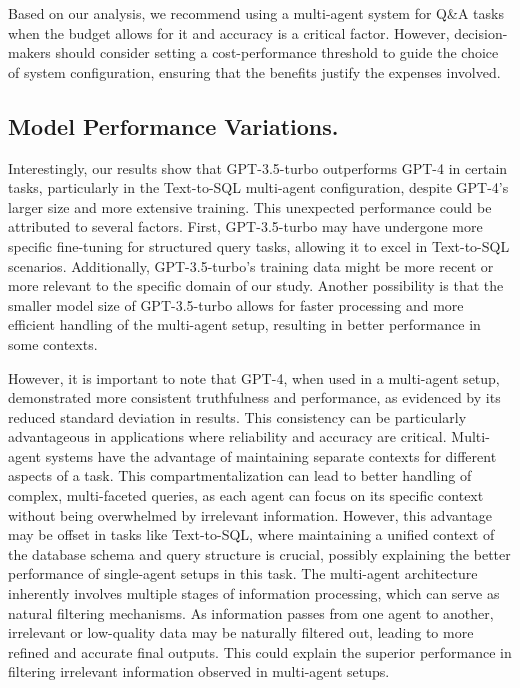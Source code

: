             Based on our analysis, we recommend using a multi-agent system for Q\&A tasks when the budget allows for it and accuracy is a critical factor. However, decision-makers should consider setting a cost-performance threshold to guide the choice of system configuration, ensuring that the benefits justify the expenses involved.


        \subsection{Model Performance Variations.}
            Interestingly, our results show that GPT-3.5-turbo outperforms GPT-4 in certain tasks, particularly in the Text-to-SQL multi-agent configuration, despite GPT-4's larger size and more extensive training. This unexpected performance could be attributed to several factors. First, GPT-3.5-turbo may have undergone more specific fine-tuning for structured query tasks, allowing it to excel in Text-to-SQL scenarios. Additionally, GPT-3.5-turbo's training data might be more recent or more relevant to the specific domain of our study. Another possibility is that the smaller model size of GPT-3.5-turbo allows for faster processing and more efficient handling of the multi-agent setup, resulting in better performance in some contexts.

            However, it is important to note that GPT-4, when used in a multi-agent setup, demonstrated more consistent truthfulness and performance, as evidenced by its reduced standard deviation in results. This consistency can be particularly advantageous in applications where reliability and accuracy are critical. Multi-agent systems have the advantage of maintaining separate contexts for different aspects of a task. This compartmentalization can lead to better handling of complex, multi-faceted queries, as each agent can focus on its specific context without being overwhelmed by irrelevant information. However, this advantage may be offset in tasks like Text-to-SQL, where maintaining a unified context of the database schema and query structure is crucial, possibly explaining the better performance of single-agent setups in this task.
            The multi-agent architecture inherently involves multiple stages of information processing, which can serve as natural filtering mechanisms. As information passes from one agent to another, irrelevant or low-quality data may be naturally filtered out, leading to more refined and accurate final outputs. This could explain the superior performance in filtering irrelevant information observed in multi-agent setups.
        
